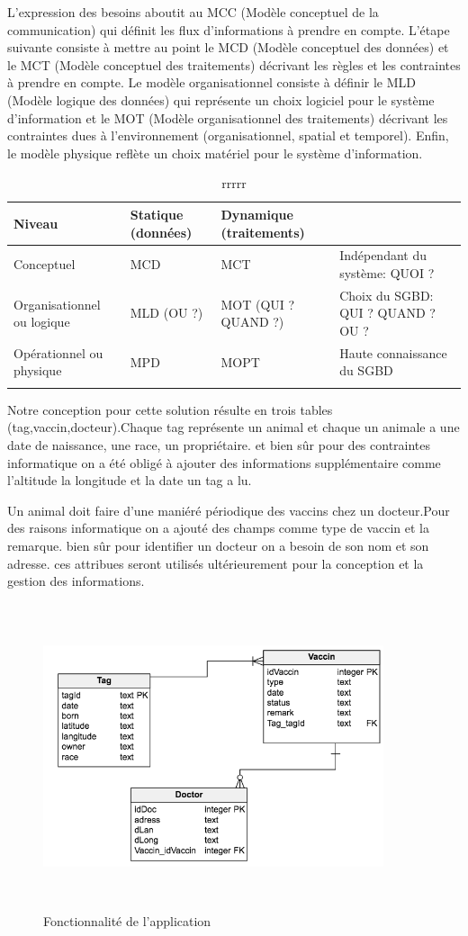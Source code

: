 \documentclass[11pt, a4paper, twoside]{book}
\begin{document}
L'expression des besoins aboutit au MCC (Modèle conceptuel de la communication) qui définit les flux d'informations à prendre en compte.
L'étape suivante consiste à mettre au point le MCD (Modèle conceptuel des données) et le MCT (Modèle conceptuel des traitements) décrivant les règles et les contraintes à prendre en compte.
Le modèle organisationnel consiste à définir le MLD (Modèle logique des données) qui représente un choix logiciel pour le système d'information et le MOT (Modèle organisationnel des traitements) décrivant les contraintes dues à l'environnement (organisationnel, spatial et temporel).
Enfin, le modèle physique reflète un choix matériel pour le système d'information. 


\begin{longtable}{|p{}|p{}|p{}| p{}|}
\hline
\textbf{Niveau } & \textbf{Statique (données) } & \textbf{Dynamique (traitements) } & \\
\hline
Conceptuel  & MCD & MCT  & Indépendant du système: QUOI ? \\
\hline
Organisationnel ou logique  & MLD
(OU ?) & MOT
(QUI ? QUAND ?) & Choix du SGBD:
QUI ? QUAND ? OU ?   \\
\hline
Opérationnel
ou physique  & MPD  & MOPT  & Haute connaissance du
SGBD \\
\hline
\caption{rrrrr}
\end{longtable}

Notre conception pour cette solution résulte en trois tables (tag,vaccin,docteur).Chaque tag représente un animal et chaque un animale a une date de naissance, une race, un propriétaire. et bien sûr pour des contraintes informatique on a été obligé à ajouter des informations supplémentaire comme l'altitude la longitude et la date un tag a lu.

Un animal doit faire d'une maniéré périodique des vaccins chez un docteur.Pour des raisons informatique on a ajouté des champs comme type de vaccin et la remarque. bien sûr pour identifier un docteur on a besoin de son nom et son adresse. ces attribues seront utilisés ultérieurement pour la conception et la gestion des informations.

\begin{figure}[!h]
\centering
\includegraphics[width=10cm,height=9cm]{ddb}
\caption{Fonctionnalité de l'application}
\end{figure}
\end{document}
